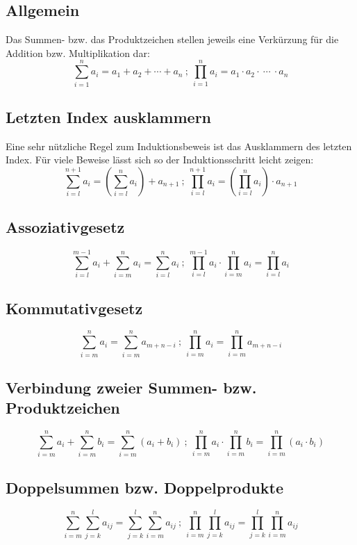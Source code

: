 \subsection{Allgemein}
Das Summen- bzw. das Produktzeichen stellen jeweils eine Verkürzung für die Addition bzw. Multiplikation dar:
\[\sum_{i=1}^{n}{a_{i}} = a_{1} + a_{2} + \cdots + a_{n} \ ;\ \prod_{i=1}^{n}{a_{i}} = a_{1} \cdot a_{2} \cdot \ \cdots\ \cdot a_{n} \]

\subsection{Letzten Index ausklammern}
Eine sehr nützliche Regel zum Induktionsbeweis ist das Ausklammern des letzten Index. Für viele Beweise lässt sich so der Induktionsschritt leicht zeigen:
\[\sum_{i=l}^{n+1}{a_{i}} = \left(\sum_{i=l}^{n}{a_{i}}\right) + a_{n+1}\ ;\ \prod_{i=l}^{n+1}{a_{i}} = \left(\prod_{i=l}^{n}{a_{i}}\right) \cdot a_{n+1}\]

\subsection{Assoziativgesetz}

\[\sum_{i=l}^{m-1}{a_{i}} + \sum_{i=m}^{n}{a_{i}} = \sum_{i=l}^{n}{a_{i}}\ ;\ \prod_{i=l}^{m-1}{a_{i}} \cdot \prod_{i=m}^{n}{a_{i}} = \prod_{i=l}^{n}{a_{i}}\]

\subsection{Kommutativgesetz}

\[\sum_{i=m}^{n}{a_{i}} = \sum_{i=m}^{n}{a_{m+n-i}}\ ;\ \prod_{i=m}^{n}{a_{i}} = \prod_{i=m}^{n}{a_{m+n-i}}\]

\subsection{Verbindung zweier Summen- bzw. Produktzeichen}

\[ \sum_{i=m}^{n}{a_{i}} + \sum_{i=m}^{n}{b_{i}} = \sum_{i=m}^{n}{\left(a_{i} + b_{i}\right)} \ ; \ \prod_{i=m}^{n}{a_{i}} \cdot \prod_{i=m}^{n}{b_{i}} = \prod_{i=m}^{n}{\left(a_{i} \cdot b_{i}\right)}\]

\subsection{Doppelsummen bzw. Doppelprodukte}

\[ \sum_{i=m}^{n}\sum_{j=k}^{l}{a_{i j}} = \sum_{j=k}^{l}\sum_{i=m}^{n}{a_{i j}} \ ; \ \prod_{i=m}^{n}\prod_{j=k}^{l}{a_{i j}} = \prod_{j=k}^{l}\prod_{i=m}^{n}{a_{i j}}\]


